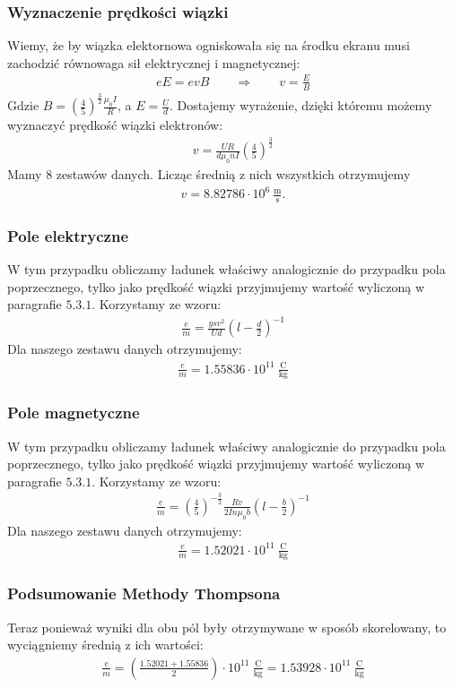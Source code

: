 \documentclass[paper=a4, fontsize=12pt]{scrartcl}
\begin{document}
\subsubsection{Wyznaczenie prędkości wiązki}
Wiemy, że by wiązka elektornowa ogniskowała się na środku ekranu musi zachodzić równowaga sił elektrycznej i magnetycznej:
\begin{align*}
eE=evB\qquad\Rightarrow \qquad v=\frac{E}{B}
\end{align*}
Gdzie $B=\left(\frac{4}{5}\right)^\frac{3}{2}\frac{\mu_0I}{R}$, a $E=\frac{U}{d}$. Dostajemy wyrażenie, dzięki któremu możemy wyznaczyć prędkość wiązki elektronów:
\begin{align*}
v=\frac{UR}{d\mu_0nI}\left(\frac{4}{5}\right)^\frac{3}{2}
\end{align*}
Mamy $8$ zestawów danych. Licząc średnią z nich wszystkich otrzymujemy 
\begin{align*}
v=8.82786\cdot10^6\:\mathrm{\frac{m}{s}}.
\end{align*}
\subsubsection{Pole elektryczne}
W tym przypadku obliczamy ładunek właściwy analogicznie do przypadku pola poprzecznego, tylko jako prędkość wiązki przyjmujemy wartość wyliczoną w paragrafie $5.3.1$.
Korzystamy ze wzoru:
\begin{align*}
\frac{e}{m}=\frac{ysv^2}{Ud}\left(l-\frac{d}{2}\right)^{-1}
\end{align*}
Dla naszego zestawu danych otrzymujemy:
\begin{align}
\frac{e}{m}=1.55836\cdot10^{11}\:\mathrm{\frac{C}{kg}}
\end{align}
\subsubsection{Pole magnetyczne}
W tym przypadku obliczamy ładunek właściwy analogicznie do przypadku pola poprzecznego, tylko jako prędkość wiązki przyjmujemy wartość wyliczoną w paragrafie $5.3.1$.
Korzystamy ze wzoru:
 \begin{align*}
 \frac{e}{m}=\left(\frac{4}{5}\right)^{-\frac{3}{2}}\frac{Rv}{2In\mu_0b}\left(l-\frac{b}{2}\right)^{-1}
 \end{align*}
 Dla naszego zestawu danych otrzymujemy:
 \begin{align}
 \frac{e}{m}=1.52021\cdot10^{11}\:\mathrm{\frac{C}{kg}}
 \end{align}
 \subsubsection{Podsumowanie Methody Thompsona}
 Teraz ponieważ wyniki dla obu pól były otrzymywane w sposób skorelowany, to wyciągniemy średnią z ich wartości:
 \begin{align}
 \frac{e}{m}=\left(\frac{1.52021+1.55836}{2}\right)\cdot10^{11}\:\mathrm{\frac{C}{kg}}=1.53928\cdot10^{11}\:\mathrm{\frac{C}{kg}}
 \end{align}
\end{document}
